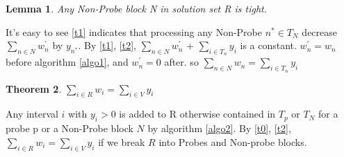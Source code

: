 \documentclass[preprint,12pt,authoryear]{elsarticle}
\newtheorem{theorem}{Theorem}[section]
\newtheorem{lemma}[theorem]{Lemma}
\newenvironment{proof}[1][Proof]{\begin{trivlist}
\item[\hskip \labelsep {\bfseries #1}]}{\end{trivlist}}
\begin{document}
\begin{lemma}
\label{t4}
Any Non-Probe block N in solution set R is tight.
\end{lemma}

\begin{proof}
It's easy to see \ref{t1} indicates that processing any Non-Probe $n^{*} \in T_{N}$ decrease $\sum\limits_{n \in N} w_{n}^{'}$ by $y_{n^{*}}$. By \ref{t1}, \ref{t2}, $\sum\limits_{n \in N} w_{n}^{'}$ + $\sum\limits_{i \in T_{n}} y_i$ is a constant. $w_{n}^{'} = w_{n}$ before algorithm \ref{algo1}, and $w_{n}^{'} = 0$ after. so  $\sum\limits_{n \in N} w_{n} = \sum\limits_{i \in T_{n}} y_i$
\end{proof}

\begin{theorem}
 $\sum\limits_{i \in R} w_{i} = \sum\limits_{i \in V} y_i$
\end{theorem}

\begin{proof}
Any interval $i$ with $y_i > 0$ is added to R otherwise contained in $T_p$ or $T_N$ for a probe p or a Non-Probe block $N$ by algorithm \ref{algo2}. By \ref{t0}, \ref{t2},  $\sum\limits_{i \in R} w_{i} = \sum\limits_{i \in V} y_i $ if we break $R$ into Probes and Non-probe blocks.
\end{proof}



\label{}








\end{document}

